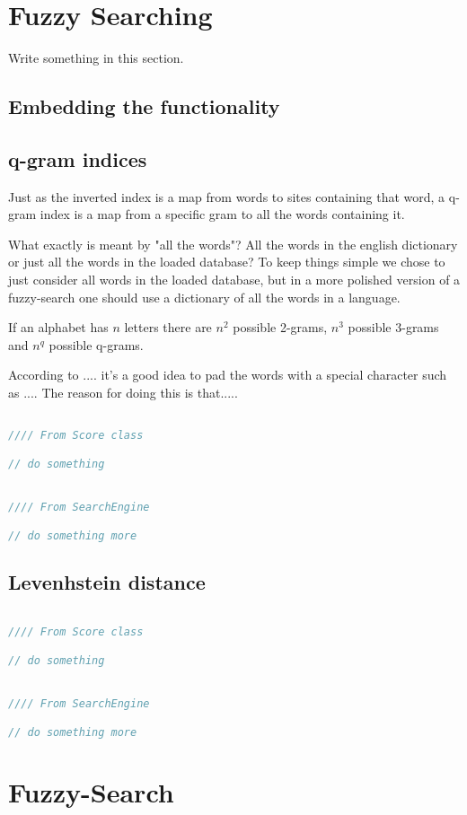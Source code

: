 \section{Fuzzy Searching}
Write something in this section.


\subsection{Embedding the functionality}




\subsection{q-gram indices}
Just as the inverted index is a map from words to sites containing that word, a q-gram index is a map from a specific gram to all the words containing it. 

What exactly is meant by "all the words"? All the words in the english dictionary or just all the words in the loaded database? To keep things simple we chose to just consider all words in the loaded database, but in a more polished version of a fuzzy-search one should use a dictionary of all the words in a language. 

If an alphabet has \(n\) letters there are \(n^2\) possible 2-grams, \(n^3\) possible 3-grams and \(n^q\) possible q-grams.

According to ....  it's a good idea to pad the words with a special character such as .... The reason for doing this is that.....


\begin{lstlisting}[language=Java, caption=This is a code example., label=lst:2-gram]

//// From Score class 

// do something	


//// From SearchEngine 

// do something more

\end{lstlisting}


\subsection{Levenhstein distance}


\begin{lstlisting}[language=Java, caption=This is a code example., label=lst:2-gram]

//// From Score class 

// do something	


//// From SearchEngine 

// do something more

\end{lstlisting}

\section{Fuzzy-Search}
